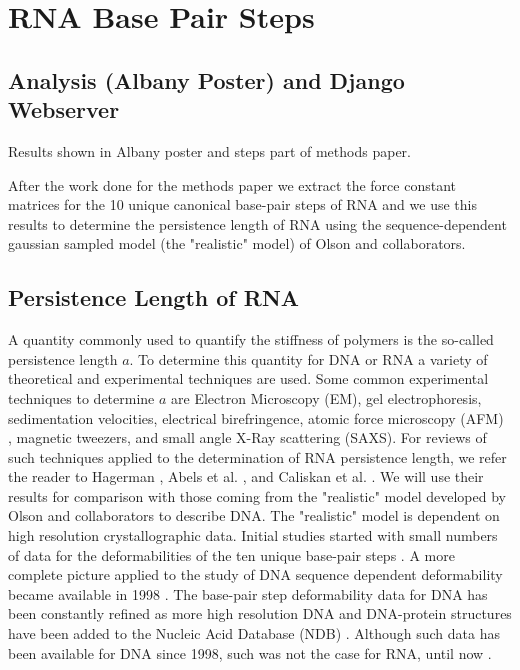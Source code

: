 \chapter{RNA Base Pair Steps}
\label{basepairsteps} 

\section{Analysis (Albany Poster) and Django Webserver}
Results shown in Albany poster and steps part of methods paper.

After the work done for the methods paper we extract the force
constant matrices for the 10 unique canonical base-pair steps of RNA
and we use this results to determine the persistence length of RNA
using the sequence-dependent gaussian sampled model (the "realistic"
model) of Olson and collaborators.

\section{Persistence Length of RNA}
A quantity commonly used to  quantify the stiffness of polymers is the
so-called persistence  length $a$. To determine this  quantity for DNA
or RNA a variety of  theoretical and experimental techniques are used.
Some  common experimental  techniques  to determine  $a$ are  Electron
Microscopy   (EM),  gel  electrophoresis,   sedimentation  velocities,
electrical  birefringence,  atomic force  microscopy  (AFM) ,  magnetic
tweezers,  and small angle  X-Ray scattering  (SAXS).  For  reviews of
such  techniques  applied  to  the determination  of  RNA  persistence
length, we refer the  reader to Hagerman \cite{hagerman1997}, Abels et
al.  \cite{abels2005},  and Caliskan et  al.  \cite{caliskan2005}.  We
will  use their  results for  comparison  with those  coming from  the
"realistic"    model   developed    by    Olson   and    collaborators
\cite{olson1995} to  describe DNA. The "realistic"  model is dependent
on  high resolution  crystallographic data.   Initial  studies started
with small numbers  of data for the deformabilities  of the ten unique
base-pair steps  \cite{olson1995}. A more complete  picture applied to
the study of DNA  sequence dependent deformability became available in
1998 \cite{olson1998}.  The base-pair  step deformability data for DNA
has  been   constantly  refined  as  more  high   resolution  DNA  and
DNA-protein  structures have been  added to  the Nucleic  Acid Database
(NDB)  \cite{balasubramanian2009}.    Although  such  data   has  been
available for  DNA since 1998, such was not the case for  RNA, until now
\cite{olson2009}.

